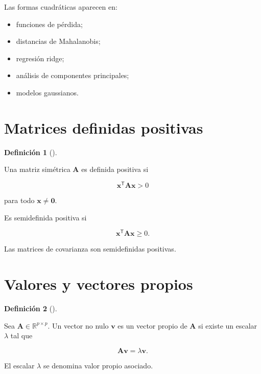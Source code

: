 \documentclass[
  spanish,
  10.5pt,
  letterpaper,
  DIV=11,
  numbers=noendperiod,
  oneside,
  open=any]{scrreprt}
\providecommand{\tightlist}{%
  \setlength{\itemsep}{0pt}\setlength{\parskip}{0pt}}
\theoremstyle{definition}
\newtheorem{definition}{Definición}[chapter]
\theoremstyle{definition}
\theoremstyle{plain}
\theoremstyle{remark}
\begin{document}
Las formas cuadráticas aparecen en:

\begin{itemize}
\tightlist
\item
  funciones de pérdida;
\item
  distancias de Mahalanobis;
\item
  regresión ridge;
\item
  análisis de componentes principales;
\item
  modelos gaussianos.
\end{itemize}

\section*{Matrices definidas
positivas}\label{matrices-definidas-positivas}


\begin{definition}[]\protect\hypertarget{def-definida-positiva}{}\label{def-definida-positiva}

Una matriz simétrica \(\mathbf{A}\) es definida positiva si

\[
\mathbf{x}^{\mathsf T}\mathbf{A}\mathbf{x}>0
\]

para todo \(\mathbf{x}\neq\mathbf{0}\).

\end{definition}

Es semidefinida positiva si

\[
\mathbf{x}^{\mathsf T}\mathbf{A}\mathbf{x}\geq 0.
\]

Las matrices de covarianza son semidefinidas positivas.

\section*{Valores y vectores propios}\label{valores-y-vectores-propios}


\begin{definition}[]\protect\hypertarget{def-valor-vector-propio}{}\label{def-valor-vector-propio}

Sea \(\mathbf{A}\in\mathbb{R}^{p\times p}\). Un vector no nulo
\(\mathbf{v}\) es un vector propio de \(\mathbf{A}\) si existe un
escalar \(\lambda\) tal que

\[
\mathbf{A}\mathbf{v}
=
\lambda\mathbf{v}.
\]

El escalar \(\lambda\) se denomina valor propio
asociado.

\end{definition}
\end{document}

